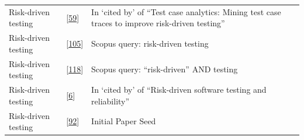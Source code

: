 \documentclass[]{book}
\begin{document}
\begin{longtable}[]{@{}lll@{}}
\begin{minipage}[t]{0.19\columnwidth}
Risk-driven testing\strut
\end{minipage} & \begin{minipage}[t]{0.41\columnwidth}\raggedright\strut
{[}\protect\hyperlink{ref-hemmati2018}{59}{]}\strut
\end{minipage} & \begin{minipage}[t]{0.32\columnwidth}\raggedright\strut
In `cited by' of ``Test case analytics: Mining test case traces to
improve risk-driven testing''\strut
\end{minipage}\tabularnewline
\begin{minipage}[t]{0.19\columnwidth}\raggedright\strut
Risk-driven testing\strut
\end{minipage} & \begin{minipage}[t]{0.41\columnwidth}\raggedright\strut
{[}\protect\hyperlink{ref-schneidewind2007}{105}{]}\strut
\end{minipage} & \begin{minipage}[t]{0.32\columnwidth}\raggedright\strut
Scopus query: risk-driven testing\strut
\end{minipage}\tabularnewline
\begin{minipage}[t]{0.19\columnwidth}\raggedright\strut
Risk-driven testing\strut
\end{minipage} & \begin{minipage}[t]{0.41\columnwidth}\raggedright\strut
{[}\protect\hyperlink{ref-vernotte2015}{118}{]}\strut
\end{minipage} & \begin{minipage}[t]{0.32\columnwidth}\raggedright\strut
Scopus query: ``risk-driven'' AND testing\strut
\end{minipage}\tabularnewline
\begin{minipage}[t]{0.19\columnwidth}\raggedright\strut
Risk-driven testing\strut
\end{minipage} & \begin{minipage}[t]{0.41\columnwidth}\raggedright\strut
{[}\protect\hyperlink{ref-atifi2017}{6}{]}\strut
\end{minipage} & \begin{minipage}[t]{0.32\columnwidth}\raggedright\strut
In `cited by' of ``Risk-driven software testing and reliability''\strut
\end{minipage}\tabularnewline
\begin{minipage}[t]{0.19\columnwidth}\raggedright\strut
Risk-driven testing\strut
\end{minipage} & \begin{minipage}[t]{0.41\columnwidth}\raggedright\strut
{[}\protect\hyperlink{ref-noor2015test}{92}{]}\strut
\end{minipage} & \begin{minipage}[t]{0.32\columnwidth}\raggedright\strut
Initial Paper Seed\strut
\end{minipage}\tabularnewline
\bottomrule
\end{longtable}
\end{document}

